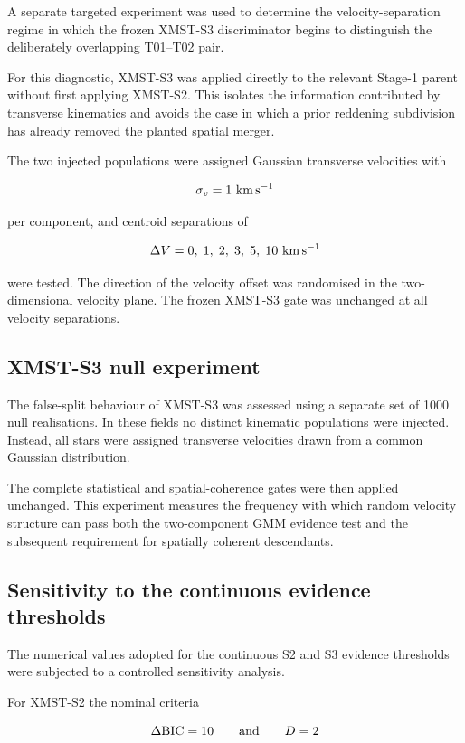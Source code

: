 \documentclass[fleqn,usenatbib]{rasti}
\begin{document}
A separate targeted experiment was used to determine the velocity-separation
regime in which the frozen XMST-S3 discriminator begins to distinguish the
deliberately overlapping T01--T02 pair.

For this diagnostic, XMST-S3 was applied directly to the relevant Stage-1
parent without first applying XMST-S2. This isolates the information
contributed by transverse kinematics and avoids the case in which a prior
reddening subdivision has already removed the planted spatial merger.

The two injected populations were assigned Gaussian transverse velocities
with

\[
\sigma_v=1~{\rm km\,s^{-1}}
\]

per component, and centroid separations of

\[
\Delta V=
0,\;1,\;2,\;3,\;5,\;10~{\rm km\,s^{-1}}
\]

were tested. The direction of the velocity offset was randomised in the
two-dimensional velocity plane. The frozen XMST-S3 gate was unchanged at
all velocity separations.


\subsection{XMST-S3 null experiment}

The false-split behaviour of XMST-S3 was assessed using a separate set of
1000 null realisations. In these fields no distinct kinematic populations
were injected. Instead, all stars were assigned transverse velocities drawn
from a common Gaussian distribution.

The complete statistical and spatial-coherence gates were then applied
unchanged. This experiment measures the frequency with which random
velocity structure can pass both the two-component GMM evidence test and
the subsequent requirement for spatially coherent descendants.


\subsection{Sensitivity to the continuous evidence thresholds}
\label{sec:gate_sensitivity}

The numerical values adopted for the continuous S2 and S3 evidence
thresholds were subjected to a controlled sensitivity analysis.

For XMST-S2 the nominal criteria

\[
\Delta{\rm BIC}=10
\qquad\hbox{and}\qquad
D=2
\]
\end{document}
